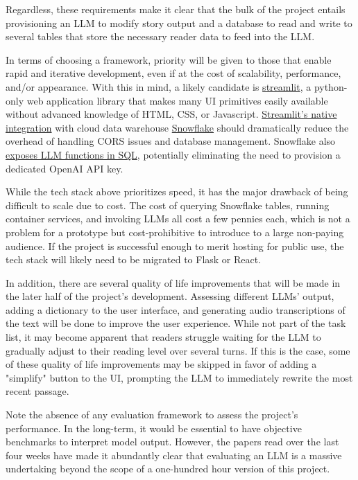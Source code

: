 \documentclass[
	letterpaper, %
]{jdf}
\begin{document}
Regardless, these requirements make it clear that the bulk of the project entails provisioning an LLM to modify story output and a database to read and write to several tables that store the necessary reader data to feed into the LLM.

In terms of choosing a framework, priority will be given to those that enable rapid and iterative development, even if at the cost of scalability, performance, and/or appearance. With this in mind, a likely candidate is \href{https://streamlit.io/}{streamlit}, a python-only web application library that makes many UI primitives easily available without advanced knowledge of HTML, CSS, or Javascript. \href{https://www.snowflake.com/en/data-cloud/overview/streamlit-in-snowflake/}{Streamlit's native integration} with cloud data warehouse \href{https://www.snowflake.com/en/}{Snowflake} should dramatically reduce the overhead of handling CORS issues and database management. Snowflake also \href{https://docs.snowflake.com/en/guides-overview-ai-features}{exposes LLM functions in SQL}, potentially eliminating the need to provision a dedicated OpenAI API key.

While the tech stack above prioritizes speed, it has the major drawback of being difficult to scale due to cost. The cost of querying Snowflake tables, running container services, and invoking LLMs all cost a few pennies each, which is not a problem for a prototype but cost-prohibitive to introduce to a large non-paying audience. If the project is successful enough to merit hosting for public use, the tech stack will likely need to be migrated to Flask or React.
 
In addition, there are several quality of life improvements that will be made in the later half of the project's development. Assessing different LLMs' output, adding a dictionary to the user interface, and generating audio transcriptions of the text will be done to improve the user experience. While not part of the task list, it may become apparent that readers struggle waiting for the LLM to gradually adjust to their reading level over several turns. If this is the case, some of these quality of life improvements may be skipped in favor of adding a "simplify" button to the UI, prompting the LLM to immediately rewrite the most recent passage.

Note the absence of any evaluation framework to assess the project's performance. In the long-term, it would be essential to have objective benchmarks to interpret model output. However, the papers read over the last four weeks have made it abundantly clear that evaluating an LLM is a massive undertaking beyond the scope of a one-hundred hour version of this project.
\end{document}
